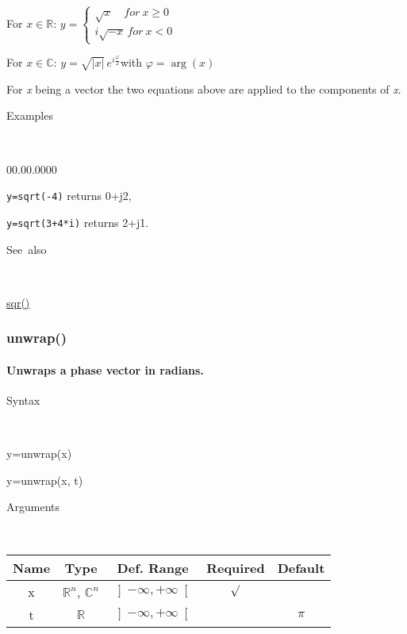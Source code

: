 \medskip{}
For $x\in\mathbb{R}$: $y=\left\{ \begin{array}{l}
\sqrt{x}\quad for\: x\geq0\\
i\sqrt{-x}\, for\: x<0\end{array}\right.$ 
\medskip{}

For $x\in\mathbb{C}$: $y=\sqrt{\left|x\right|}\, e^{i\frac{\varphi}{2}}$with
$\varphi=\arg\left(x\right)$
\medskip{}

\noindent For \textit{x} being a vector the two equations above are
applied to the components of \textit{x}.

\begin{description}
\item [Examples]~
\end{description}
\begin{lyxlist}{00.00.0000}
\item [\texttt{y=sqrt(-4)}]returns 0+j2,
\item [\texttt{y=sqrt(3+4{*}i)}]returns 2+j1.
\end{lyxlist}
\begin{description}
\item [See~also]~
\end{description}
\textcolor{blue}{\hyperlink{sqr}{sqr()}}


\newpage
\subsubsection*{\hypertarget{unwrap}{}{\Large unwrap()}}


\paragraph{\label{par:Unwrap}Unwraps a phase vector in radians.}

\begin{description}
\item [Syntax]~
\end{description}
y=unwrap(x)

\noindent y=unwrap(x, t)

\begin{description}
\item [Arguments]~
\end{description}
\begin{tabular}{|c|c|c|c|c|}
\hline 
Name&
Type&
Def. Range&
Required&
Default\tabularnewline
\hline
\hline 
x&
$\mathbb{R}^{n}$, $\mathbb{C}^{n}$&
$\left]-\infty,+\infty\right[$&
$\surd$&
\tabularnewline
\hline
t&
$\mathbb{R}$&
$\left]-\infty,+\infty\right[$&
&
$\pi$\tabularnewline
\hline
\end{tabular}

